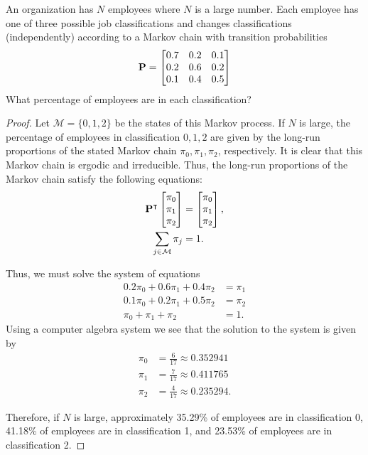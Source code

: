 \begin{problem}{4.29}
  An organization has $N$ employees where $N$ is a large number. Each employee
  has one of three possible job classifications and changes classifications (independently)
  according to a Markov chain with transition probabilities
  \begin{align*}
    \bold{P} =
    \begin{bmatrix}
      0.7 & 0.2 & 0.1 \\
      0.2 & 0.6 & 0.2 \\
      0.1 & 0.4 & 0.5
    \end{bmatrix}
  \end{align*}
  What percentage of employees are in each classification?
\end{problem}

\begin{proof}
  Let $\mathcal{M} = \{0,1,2\}$ be the states of this Markov process.
  If $N$ is large, the percentage of employees in classification $0, 1, 2$ are given by the long-run
  proportions of the stated Markov chain $\pi_0, \pi_1, \pi_2$, respectively.
  It is clear that this Markov chain is ergodic and irreducible. Thus, the long-run
  proportions of the Markov chain satisfy the following equations:
  \begin{align*}
     \bold{P}^\intercal \begin{bmatrix} \pi_0 \\ \pi_1 \\ \pi_2 \\ \end{bmatrix} &= \begin{bmatrix} \pi_0 \\ \pi_1 \\ \pi_2 \\\end{bmatrix},\\
     \sum_{j\in \mathcal{M}} \pi_j &= 1.
  \end{align*}

  Thus, we must solve the system of equations
  \begin{align*}
    0.2 \pi_0 + 0.6 \pi_1 + 0.4 \pi_2 &= \pi_1 \\
    0.1 \pi_0 + 0.2 \pi_1 + 0.5 \pi_2 &= \pi_2 \\
    \pi_0 + \pi_1 + \pi_2 &= 1.
  \end{align*}
  Using a computer algebra system we see that the solution to the system is given
  by
  \begin{align*}
    \pi_0 &= \frac{6}{17} \approx 0.352941 \\
    \pi_1 &= \frac{7}{17} \approx 0.411765 \\
    \pi_2 &= \frac{4}{17} \approx 0.235294.
  \end{align*}

  Therefore, if $N$ is large, approximately 35.29\% of employees are in classification 0,
  41.18\% of employees are in classification 1, and 23.53\% of employees are in classification 2.
\end{proof}
\newpage
